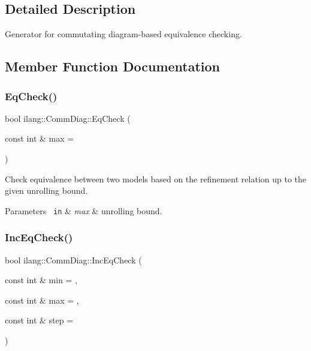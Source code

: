 \subsection{Detailed Description}
Generator for commutating diagram-\/based equivalence checking. 

\subsection{Member Function Documentation}
\mbox{\label{classilang_1_1_comm_diag_ab5f4df82ccead4a6b23df4096df344d0}} 
\subsubsection{\texorpdfstring{Eq\+Check()}{EqCheck()}}
{\footnotesize\ttfamily bool ilang\+::\+Comm\+Diag\+::\+Eq\+Check (\begin{DoxyParamCaption}\item[{const int \&}]{max = {} }\end{DoxyParamCaption})}



Check equivalence between two models based on the refinement relation up to the given unrolling bound. 


\begin{DoxyParams}[1]{Parameters}
\mbox{\texttt{ in}}  & {\em max} & unrolling bound. \\
\hline
\end{DoxyParams}
\mbox{\label{classilang_1_1_comm_diag_afe69e51f7e659fbeb5fa0a247bf8ee49}} 
\subsubsection{\texorpdfstring{Inc\+Eq\+Check()}{IncEqCheck()}}
{\footnotesize\ttfamily bool ilang\+::\+Comm\+Diag\+::\+Inc\+Eq\+Check (\begin{DoxyParamCaption}\item[{const int \&}]{min = {},  }\item[{const int \&}]{max = {},  }\item[{const int \&}]{step = {} }\end{DoxyParamCaption})}



